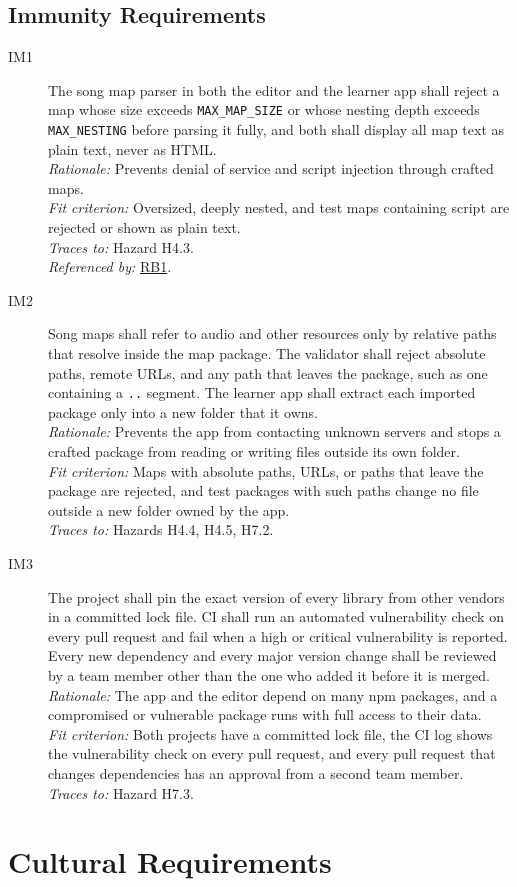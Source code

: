 \documentclass[12pt]{article}
\newcommand{\cn}[1]{\texttt{#1}}
\newcommand{\rat}[1]{\\\textit{Rationale:} #1}
\newcommand{\fit}[1]{\\\textit{Fit criterion:} #1}
\newcommand{\trace}[1]{\\\textit{Traces to:} #1}
\newcommand{\usedby}[1]{\\\textit{Referenced by:} #1}
\newcommand{\reqdef}[1]{\hypertarget{req:#1}{#1}}
\newcommand{\req}[1]{\hyperlink{req:#1}{#1}}
\begin{document}
\subsection{Immunity Requirements}
\begin{description}
\item[\reqdef{IM1}] The song map parser in both the editor and the learner app shall
reject a map whose size exceeds \cn{MAX\_MAP\_SIZE} or whose nesting depth
exceeds \cn{MAX\_NESTING} before parsing it fully, and both shall display all
map text as plain text, never as HTML.
\rat{Prevents denial of service and script injection through crafted maps.}
\fit{Oversized, deeply nested, and test maps containing script are rejected or
shown as plain text.}
\trace{Hazard H4.3.}
\usedby{\req{RB1}.}

\item[\reqdef{IM2}] Song maps shall refer to audio and other resources only by relative
paths that resolve inside the map package. The validator shall reject absolute
paths, remote URLs, and any path that leaves the package, such as one
containing a \texttt{..} segment. The learner app shall extract each imported
package only into a new folder that it owns.
\rat{Prevents the app from contacting unknown servers and stops a crafted
package from reading or writing files outside its own folder.}
\fit{Maps with absolute paths, URLs, or paths that leave the package are
rejected, and test packages with such paths change no file outside a new
folder owned by the app.}
\trace{Hazards H4.4, H4.5, H7.2.}

\item[\reqdef{IM3}] The project shall pin the exact version of every library from other
vendors in a committed lock file. CI shall run an automated vulnerability check
on every pull request and fail when a high or critical vulnerability is
reported. Every new dependency and every major version change shall be
reviewed by a team member other than the one who added it before it is merged.
\rat{The app and the editor depend on many npm packages, and a compromised or
vulnerable package runs with full access to their data.}
\fit{Both projects have a committed lock file, the CI log shows the
vulnerability check on every pull request, and every pull request that changes
dependencies has an approval from a second team member.}
\trace{Hazard H7.3.}
\end{description}

\section{Cultural Requirements}
\end{document}
